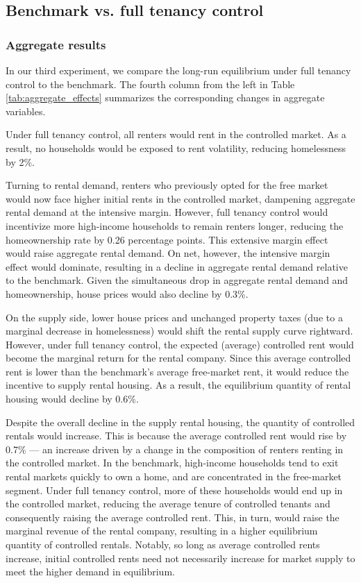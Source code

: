 \documentclass[parskip=full]{article}
\begin{document}
\subsection{Benchmark vs. full tenancy control}\label{subsection:full_control}

\subsubsection{Aggregate results}

In our third experiment, we compare the long-run equilibrium under full tenancy control to the benchmark. The fourth column from the left in Table \ref{tab:aggregate_effects} summarizes the corresponding changes in aggregate variables.

Under full tenancy control, all renters would rent in the controlled market. As a result, no households would be exposed to rent volatility, reducing homelessness by 2\%.

Turning to rental demand, renters who previously opted for the free market would now face higher initial rents in the controlled market, dampening aggregate rental demand at the intensive margin. However, full tenancy control would incentivize more high-income households to remain renters longer, reducing the homeownership rate by 0.26 percentage points. This extensive margin effect would raise aggregate rental demand. On net, however, the intensive margin effect would dominate, resulting in a decline in aggregate rental demand relative to the benchmark. Given the simultaneous drop in aggregate rental demand and homeownership, house prices would also decline by 0.3\%.

On the supply side, lower house prices and unchanged property taxes (due to a marginal decrease in homelessness) would shift the rental supply curve rightward. However, under full tenancy control, the expected (average) controlled rent would become the marginal return for the rental company. Since this average controlled rent is lower than the benchmark's average free-market rent, it would reduce the incentive to supply rental housing. As a result, the equilibrium quantity of rental housing would decline by 0.6\%.

Despite the overall decline in the supply rental housing, the quantity of controlled rentals would increase. This is because the average controlled rent would rise by 0.7\% — an increase driven by a change in the composition of renters renting in the controlled market. In the benchmark, high-income households tend to exit rental markets quickly to own a home, and are concentrated in the free-market segment. Under full tenancy control, more of these households would end up in the controlled market, reducing the average tenure of controlled tenants and consequently raising the average controlled rent. This, in turn, would raise the marginal revenue of the rental company, resulting in a higher equilibrium quantity of controlled rentals. Notably, so long as average controlled rents increase, initial controlled rents need not necessarily increase for market supply to meet the higher demand in equilibrium.
\end{document}
